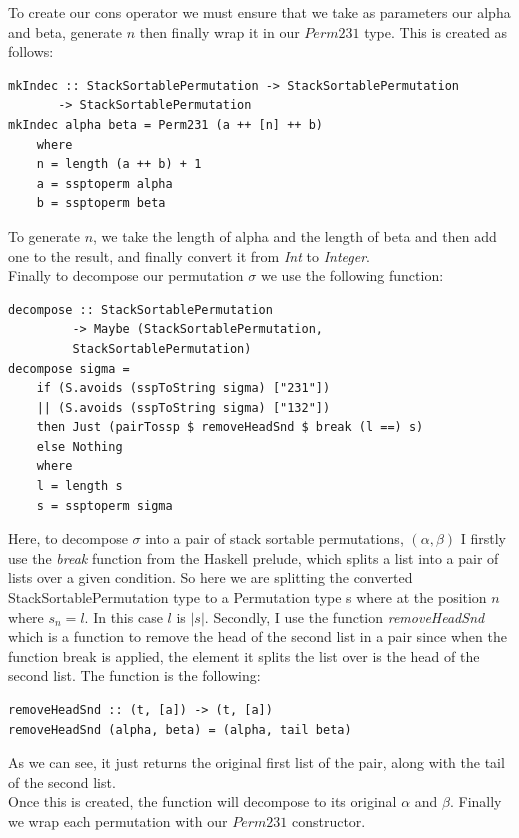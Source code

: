 \documentclass[12pt]{article}
\begin{document}
To create our cons operator we must ensure that we take as parameters our alpha and beta, generate $n$ then finally wrap it in our $Perm231$ type. This is created as follows:
\begin{lstlisting}
mkIndec :: StackSortablePermutation -> StackSortablePermutation 
	   -> StackSortablePermutation
mkIndec alpha beta = Perm231 (a ++ [n] ++ b)
	where
	n = length (a ++ b) + 1
	a = ssptoperm alpha
	b = ssptoperm beta
\end{lstlisting}
To generate $n$, we take the length of alpha and the length of beta and then add one to the result, and finally convert it from {\it Int} to {\it Integer}.\\
Finally to decompose our permutation $\sigma$ we use the following function:
\begin{lstlisting}
decompose :: StackSortablePermutation 
	     -> Maybe (StackSortablePermutation,
		 StackSortablePermutation)
decompose sigma = 
	if (S.avoids (sspToString sigma) ["231"]) 
	|| (S.avoids (sspToString sigma) ["132"])
	then Just (pairTossp $ removeHeadSnd $ break (l ==) s)
	else Nothing
	where
	l = length s
	s = ssptoperm sigma
\end{lstlisting}
Here, to decompose $\sigma$ into a pair of stack sortable permutations, $(\alpha, \beta)$ I firstly use the {\it break} function from the Haskell prelude, which splits a list into a pair of lists over a given condition. So here we are splitting the converted StackSortablePermutation type to a Permutation type s where at the position $n$ where $s_n = l$. In this case $l$ is $|s|$. Secondly, I use the function {\it removeHeadSnd} which is a function to remove the head of the second list in a pair since when the function break is applied, the element it splits the list over is the head of the second list. The function is the following:\\
\begin{lstlisting}
removeHeadSnd :: (t, [a]) -> (t, [a])
removeHeadSnd (alpha, beta) = (alpha, tail beta)
\end{lstlisting} 
As we can see, it just returns the original first list of the pair, along with the tail of the second list.\\
Once this is created, the function will decompose to its original $\alpha$ and $\beta$. Finally we wrap each permutation with our $Perm231$ constructor.
\end{document}
